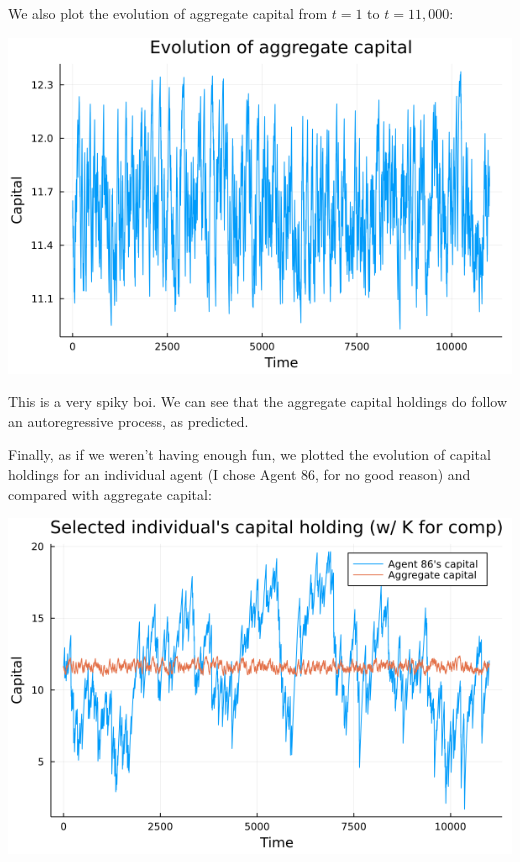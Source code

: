 \documentclass[12pt]{article}
\begin{document}
We also plot the evolution of aggregate capital from $t = 1$ to $t = 11,000$:
\begin{center}
    \includegraphics[scale=0.4]{akplot.png}
\end{center}
This is a very spiky boi. We can see that the aggregate capital holdings do follow an autoregressive process, as predicted.

Finally, as if we weren't having enough fun, we plotted the evolution of capital holdings for an individual agent (I chose Agent 86, for no good reason) and compared with aggregate capital:
\begin{center}
    \includegraphics[scale=0.4]{indiv_plot.png}
\end{center}
\end{document}
